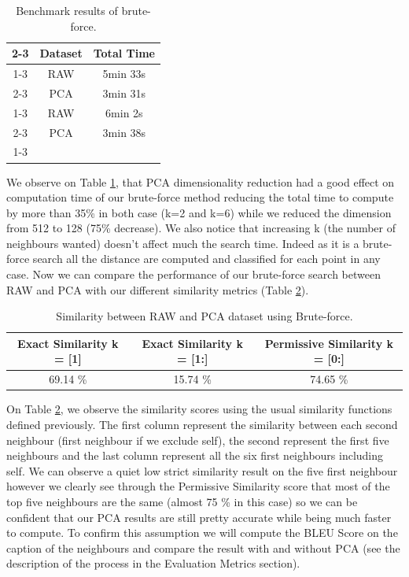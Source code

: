 \documentclass[a4paper]{article}
\begin{document}
	\begin{table}[h]
		\centering
		\begin{tabular}{ c | c | c |}
			\cline{2-3}
			& Dataset & Total Time \\ \cline{1-3}
			\multicolumn{1}{ |c|  }{\multirow{2}{*}{k=2} } & RAW & 5min 33s  \\ \cline{2-3}
			\multicolumn{1}{ |c|  }{} & PCA & 3min 31s  \\ \cline{1-3}
			\multicolumn{1}{ |c|  }{\multirow{2}{*}{k=6} } & RAW & 6min 2s \\ \cline{2-3}
			\multicolumn{1}{ |c|  }{} & PCA & 3min 38s \\ \cline{1-3}
		\end{tabular}
		\caption{Benchmark results of brute-force.}
		\label{table:benchmark-bruteforce}
	\end{table}
	
	We observe on Table \ref{table:benchmark-bruteforce}, that PCA dimensionality reduction had a good effect on computation time of our brute-force method reducing the total time to compute by more than 35\% in both case (k=2 and k=6) while we reduced the dimension from 512 to 128 (75\% decrease). We also notice that increasing k (the number of neighbours wanted) doesn't affect much the search time. Indeed as it is a brute-force search all the distance are computed and classified for each point in any case. Now we can compare the performance of our brute-force search between RAW and PCA with our different similarity metrics (Table \ref{table:sim-bruteforce}).
	
	\begin{table}[h]
		\centering
		\begin{tabular}{ | c | c | c |}
		\hline
			Exact Similarity k = [1] & Exact Similarity k = [1:] & Permissive Similarity k = [0:] \\ \hline
			69.14 \% & 15.74 \% & 74.65 \% \\ \hline
			
		\end{tabular}
		\caption{Similarity between RAW and PCA dataset using Brute-force.}
		\label{table:sim-bruteforce}
	\end{table}
	
	On Table \ref{table:sim-bruteforce}, we observe the similarity scores using the usual similarity functions defined previously. The first column represent the similarity between each second neighbour (first neighbour if we exclude self), the second represent the first five neighbours and the last column represent all the six first neighbours including self. We can observe a quiet low strict similarity result on the five first neighbour however we clearly see through the Permissive Similarity score that most of the top five neighbours are the same (almost 75 \% in this case) so we can be confident that our PCA results are still pretty accurate while being much faster to compute. To confirm this assumption we will compute the BLEU Score on the caption of the neighbours and compare the result with and without PCA (see the description of the process in the Evaluation Metrics section). \\
	
\end{document}
